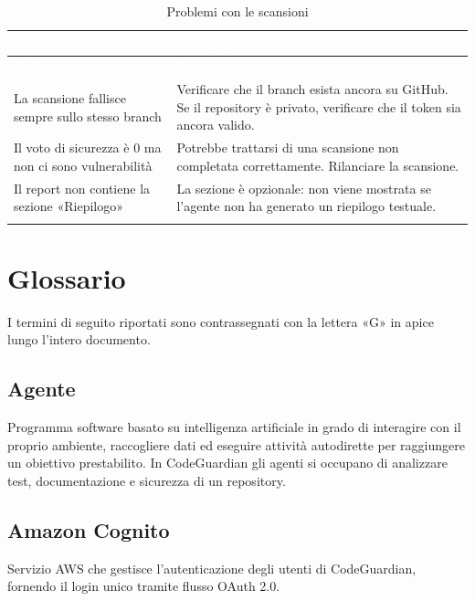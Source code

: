 \documentclass[a4paper, 11pt]{article}
\begin{document}
\begin{longtable}{>{\raggedright\arraybackslash}p{5cm} >{\raggedright\arraybackslash}p{9cm}}
  \rowcolor{AccentColor}
  \textcolor{white}{\textbf{Problema}} &
  \textcolor{white}{\textbf{Soluzione}} \\
  \endfirsthead

  \rowcolor{AccentColor}
  \textcolor{white}{\textbf{Problema}} &
  \textcolor{white}{\textbf{Soluzione}} \\
  \endhead

  La scansione fallisce sempre sullo stesso branch &
  Verificare che il branch esista ancora su GitHub. Se il repository è privato, verificare che il token sia ancora valido. \\
  Il voto di sicurezza è 0 ma non ci sono vulnerabilità &
  Potrebbe trattarsi di una scansione non completata correttamente. Rilanciare la scansione. \\
  Il report non contiene la sezione «Riepilogo» &
  La sezione è opzionale: non viene mostrata se l'agente non ha generato un riepilogo testuale. \\
\caption{Problemi con le scansioni}
\label{tab:problemi-scan}
\end{longtable}

\section{Glossario}\label{sec:glossario}

I termini di seguito riportati sono contrassegnati con la lettera «G» in apice lungo l'intero documento.

\subsection{Agente}
Programma software basato su intelligenza artificiale in grado di interagire con il proprio ambiente, raccogliere dati ed eseguire attività autodirette per raggiungere un obiettivo prestabilito. In CodeGuardian gli agenti si occupano di analizzare test, documentazione e sicurezza di un repository.

\subsection{Amazon Cognito}
Servizio AWS che gestisce l'autenticazione degli utenti di CodeGuardian, fornendo il login unico tramite flusso OAuth 2.0.
\end{document}
